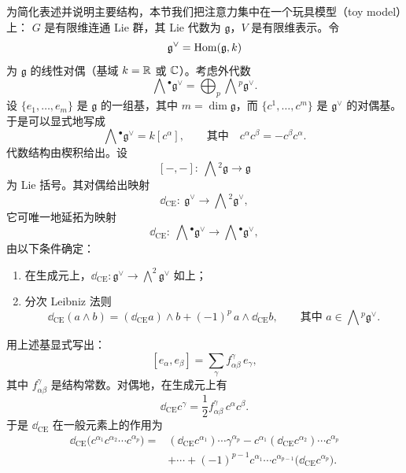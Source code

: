 为简化表述并说明主要结构，本节我们把注意力集中在一个玩具模型（toy model）上：
$G$ 是有限维连通 Lie 群，其 Lie 代数为 $\mathfrak g$，$V$ 是有限维表示。令
\[
  \mathfrak g^{\vee}=\operatorname{Hom}(\mathfrak g,k)
\]
为 $\mathfrak g$ 的线性对偶（基域 $k=\mathbb{R}$ 或 $\mathbb{C}$）。考虑外代数
\[
  \bigwedge{}^{\bullet}\mathfrak g^{\vee}
  =\bigoplus_{p}\bigwedge{}^{p}\mathfrak g^{\vee}.
\]
设 $\{e_1,\dots,e_m\}$ 是 $\mathfrak g$ 的一组基，其中 $m=\dim\mathfrak g$，而
$\{c^1,\dots,c^m\}$ 是 $\mathfrak g^{\vee}$ 的对偶基。于是可以显式地写成
\[
  \bigwedge{}^{\bullet}\mathfrak g^{\vee}=k[c^\alpha],
  \qquad\text{其中}\quad c^\alpha c^\beta=-c^\beta c^\alpha .
\]
代数结构由楔积给出。设
\[
  [-,-]:\ \bigwedge{}^{2}\mathfrak g\longrightarrow\mathfrak g
\]
为 Lie 括号。其对偶给出映射
\[
  \dd_{\mathrm{CE}}:\ \mathfrak g^{\vee}\longrightarrow\bigwedge{}^{2}\mathfrak g^{\vee},
\]
它可唯一地延拓为映射
\[
  \dd_{\mathrm{CE}}:\ \bigwedge{}^{\bullet}\mathfrak g^{\vee}
  \longrightarrow\bigwedge{}^{\bullet}\mathfrak g^{\vee},
\]
由以下条件确定：
\begin{enumerate}[label=\arabic*),leftmargin=1.8em,itemsep=0.2em]
  \item 在生成元上，$\dd_{\mathrm{CE}}:\mathfrak g^{\vee}\to
        \bigwedge^{2}\mathfrak g^{\vee}$ 如上；
  \item 分次 Leibniz 法则
  \[
    \dd_{\mathrm{CE}}(a\wedge b)
    =(\dd_{\mathrm{CE}}a)\wedge b+(-1)^{p}\,a\wedge \dd_{\mathrm{CE}}b,
    \qquad\text{其中 } a\in\bigwedge{}^{p}\mathfrak g^{\vee}.
  \]
\end{enumerate}


用上述基显式写出：
\[
  [e_\alpha,e_\beta]=\sum_{\gamma}f^{\gamma}_{\alpha\beta}\,e_\gamma,
\]
其中 $f^{\gamma}_{\alpha\beta}$ 是结构常数。对偶地，在生成元上有
\[
  \dd_{\mathrm{CE}}c^{\gamma}
  =\frac{1}{2}f^{\gamma}_{\alpha\beta}\,c^{\alpha}c^{\beta}.
\]
于是 $\dd_{\mathrm{CE}}$ 在一般元素上的作用为
\[
  \begin{aligned}
    \dd_{\mathrm{CE}}\bigl(c^{\alpha_1}c^{\alpha_2}\cdots c^{\alpha_p}\bigr)
    ={}&(\dd_{\mathrm{CE}}c^{\alpha_1})\cdots\gamma^{\alpha_p}
      -c^{\alpha_1}(\dd_{\mathrm{CE}}c^{\alpha_2})\cdots c^{\alpha_p}\\
      &+\cdots+(-1)^{p-1}c^{\alpha_1}\cdots c^{\alpha_{p-1}}
      \bigl(\dd_{\mathrm{CE}}c^{\alpha_p}\bigr).
  \end{aligned}
\]

